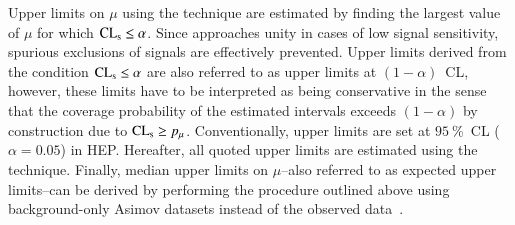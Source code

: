 Upper limits on $\mu$ using the \CLs technique are estimated by finding the
largest value of $\mu$ for which $\text{CL}_{\text{s}} \leq \alpha$. Since \CLs approaches unity
in cases of low signal sensitivity, spurious exclusions of signals are
effectively prevented. Upper limits derived from the condition
$\text{CL}_{\text{s}} \leq \alpha$ are also referred to as upper limits at $(1 - \alpha)$~CL,
however, these limits have to be interpreted as being conservative in the sense
that the coverage probability of the estimated intervals exceeds $(1 - \alpha)$
by construction due to $\text{CL}_{\text{s}} \geq p_\mu$. Conventionally, upper limits are set
at $\SI{95}{\percent}$~CL ($\alpha = 0.05$) in HEP. Hereafter, all quoted upper
limits are estimated using the \CLs technique. Finally, median upper limits on
$\mu$--also referred to as expected upper limits--can be derived by performing
the procedure outlined above using background-only Asimov datasets instead of
the observed data~\cite{Cowan:2010js}.


